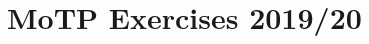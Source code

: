\documentclass[../template.tex]{subfiles}
\begin{document}
\chapter{MoTP Exercises 2019/20}
\begin{comment}
\section{Stochastic Processes and Path Integrals}

\begin{exo}[Stirling's approximation]
    Use the $\Gamma$ function definition:
    \begin{align}
        \Gamma(n) \equiv \int_0^\infty x^{n-1} e^{-x} \dd{x} \quad n > 0\qquad \Gamma(n+1) = n! \label{eqn:gamma-func}
    \end{align}
    together with the saddle point approximation to derive the result used in chapter $2$ of Lecture Notes:
    \begin{align}
        \ln n! = n\ln n - n + \frac{1}{2} \ln(2 \pi n) + O\left(\frac{1}{n} \right) \label{eqn:stirling}
    \end{align} 

    \medskip

    \textbf{Solution}. To use the saddle-point approximation we need to rewrite (\ref{eqn:gamma-func}) in the following form:
    \begin{align}
        I(\lambda) = \int_S \dd{x} \exp\left(-\frac{F(x)}{\lambda} \right)
    \end{align}
    So that:
    \begin{align}
        I(\lambda) \underset{\lambda \to 0}{\approx}  \sqrt{2 \pi \lambda} \left(\pdv{F}{x} (x) \Big|_{x=x_0}\right)^{-1/2} \exp\left(-\frac{F(x_0)}{\lambda} \right)
        \label{eqn:saddle-formula}
    \end{align}
    where $x_0$ is a global minimum of $F(x)$.  


\end{comment}
\end{document}
